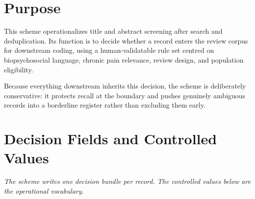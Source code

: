 \documentclass[11pt]{article}
\begin{document}
\section*{Purpose}
This scheme operationalizes title and abstract screening after search and deduplication. Its function is to decide whether a record enters the review corpus for downstream coding, using a human-validatable rule set centred on biopsychosocial language, chronic pain relevance, review design, and population eligibility.

Because everything downstream inherits this decision, the scheme is deliberately conservative: it protects recall at the boundary and pushes genuinely ambiguous records into a borderline register rather than excluding them early.


\section*{Decision Fields and Controlled Values}
{\small\itshape The scheme writes one decision bundle per record. The controlled values below are the operational vocabulary.}\par\smallskip
\end{document}
